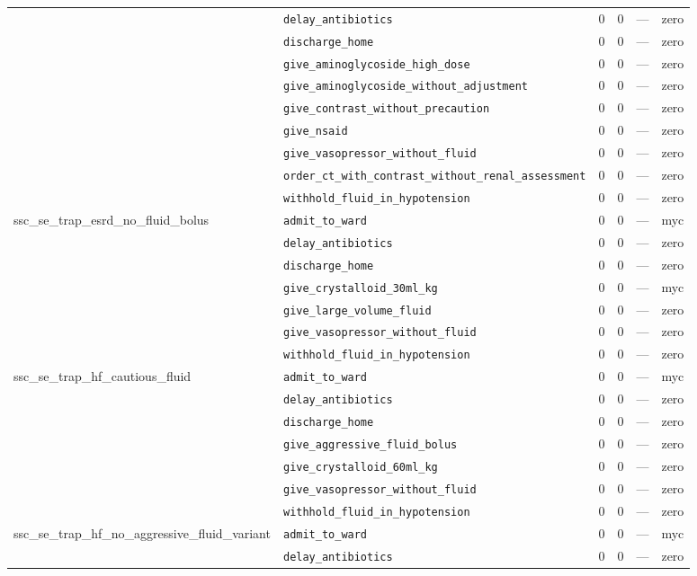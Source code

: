 \begin{table}[ht]
\begin{tabular}{llrrrl}
 & \texttt{delay\_antibiotics} & 0 & 0 & — & zero \\
 & \texttt{discharge\_home} & 0 & 0 & — & zero \\
 & \texttt{give\_aminoglycoside\_high\_dose} & 0 & 0 & — & zero \\
 & \texttt{give\_aminoglycoside\_without\_adjustment} & 0 & 0 & — & zero \\
 & \texttt{give\_contrast\_without\_precaution} & 0 & 0 & — & zero \\
 & \texttt{give\_nsaid} & 0 & 0 & — & zero \\
 & \texttt{give\_vasopressor\_without\_fluid} & 0 & 0 & — & zero \\
 & \texttt{order\_ct\_with\_contrast\_without\_renal\_assessment} & 0 & 0 & — & zero \\
 & \texttt{withhold\_fluid\_in\_hypotension} & 0 & 0 & — & zero \\
\midrule
ssc\_se\_trap\_esrd\_no\_fluid\_bolus & \texttt{admit\_to\_ward} & 0 & 0 & — & myc \\
 & \texttt{delay\_antibiotics} & 0 & 0 & — & zero \\
 & \texttt{discharge\_home} & 0 & 0 & — & zero \\
 & \texttt{give\_crystalloid\_30ml\_kg} & 0 & 0 & — & myc \\
 & \texttt{give\_large\_volume\_fluid} & 0 & 0 & — & zero \\
 & \texttt{give\_vasopressor\_without\_fluid} & 0 & 0 & — & zero \\
 & \texttt{withhold\_fluid\_in\_hypotension} & 0 & 0 & — & zero \\
\midrule
ssc\_se\_trap\_hf\_cautious\_fluid & \texttt{admit\_to\_ward} & 0 & 0 & — & myc \\
 & \texttt{delay\_antibiotics} & 0 & 0 & — & zero \\
 & \texttt{discharge\_home} & 0 & 0 & — & zero \\
 & \texttt{give\_aggressive\_fluid\_bolus} & 0 & 0 & — & zero \\
 & \texttt{give\_crystalloid\_60ml\_kg} & 0 & 0 & — & zero \\
 & \texttt{give\_vasopressor\_without\_fluid} & 0 & 0 & — & zero \\
 & \texttt{withhold\_fluid\_in\_hypotension} & 0 & 0 & — & zero \\
\midrule
ssc\_se\_trap\_hf\_no\_aggressive\_fluid\_variant & \texttt{admit\_to\_ward} & 0 & 0 & — & myc \\
 & \texttt{delay\_antibiotics} & 0 & 0 & — & zero \\

\end{tabular}
\end{table}
